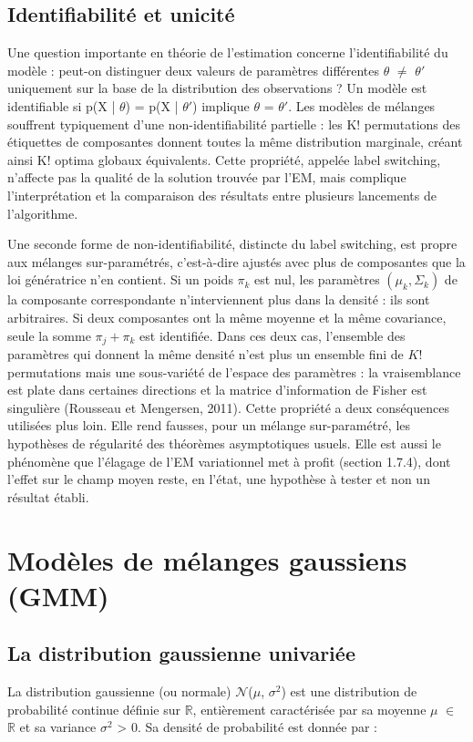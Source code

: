 \subsection{Identifiabilité et unicité}
Une question importante en théorie de l'estimation concerne l'identifiabilité du modèle : peut-on distinguer deux valeurs de paramètres différentes $\theta $ $\neq $ $\theta ' $ uniquement sur la base de la distribution des observations ? Un modèle est identifiable si p(X | $\theta $) = p(X | $\theta ' $) implique $\theta $ = $\theta ' $. Les modèles de mélanges souffrent typiquement d'une non-identifiabilité partielle : les K! permutations des étiquettes de composantes donnent toutes la même distribution marginale, créant ainsi K! optima globaux équivalents. Cette propriété, appelée label switching, n'affecte pas la qualité de la solution trouvée par l'EM, mais complique l'interprétation et la comparaison des résultats entre plusieurs lancements de l'algorithme.

Une seconde forme de non-identifiabilité, distincte du label switching, est propre aux mélanges sur-paramétrés, c'est-à-dire ajustés avec plus de composantes que la loi génératrice n'en contient. Si un poids $\pi_k$ est nul, les paramètres $(\mu_k, \Sigma_k)$ de la composante correspondante n'interviennent plus dans la densité : ils sont arbitraires. Si deux composantes ont la même moyenne et la même covariance, seule la somme $\pi_j + \pi_k$ est identifiée. Dans ces deux cas, l'ensemble des paramètres qui donnent la même densité n'est plus un ensemble fini de $K!$ permutations mais une sous-variété de l'espace des paramètres : la vraisemblance est plate dans certaines directions et la matrice d'information de Fisher est singulière (Rousseau et Mengersen, 2011). Cette propriété a deux conséquences utilisées plus loin. Elle rend fausses, pour un mélange sur-paramétré, les hypothèses de régularité des théorèmes asymptotiques usuels. Elle est aussi le phénomène que l'élagage de l'EM variationnel met à profit (section 1.7.4), dont l'effet sur le champ moyen reste, en l'état, une hypothèse à tester et non un résultat établi.


\section{Modèles de mélanges gaussiens (GMM)}
\subsection{La distribution gaussienne univariée}
La distribution gaussienne (ou normale) $\mathcal{N}$($\mu $, $\sigma ^{2}$) est une distribution de probabilité continue définie sur $\mathbb{R}$, entièrement caractérisée par sa moyenne $\mu $ $\in $ $\mathbb{R}$ et sa variance $\sigma ^{2}$ > 0. Sa densité de probabilité est donnée par :

